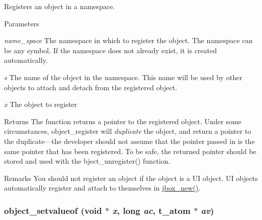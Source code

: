 Registers an object in a namespace. 
\begin{DoxyParams}{Parameters}
\item[{\em name\_\-space}]The namespace in which to register the object. The namespace can be any symbol. If the namespace does not already exist, it is created automatically. \item[{\em s}]The name of the object in the namespace. This name will be used by other objects to attach and detach from the registered object. \item[{\em x}]The object to register\end{DoxyParams}
\begin{DoxyReturn}{Returns}
The function returns a pointer to the registered object. Under some circumstances, object\_\-register will {\itshape duplicate\/} the object, and return a pointer to the duplicate—the developer should not assume that the pointer passed in is the same pointer that has been registered. To be safe, the returned pointer should be stored and used with the bject\_\-unregister() function.
\end{DoxyReturn}
\begin{DoxyRemark}{Remarks}
You should not register an object if the object is a UI object. UI objects automatically register and attach to themselves in \hyperlink{group__jbox_gaaa460d02ca3d22c54368ade59d8e330b}{jbox\_\-new()}. 
\end{DoxyRemark}
\hypertarget{group__obj_ga9d653fc9249f24c462f14657b969cc4d}{
\subsubsection[{object\_\-setvalueof}]{ object\_\-setvalueof (void $\ast$ {\em x}, \/  long {\em ac}, \/  {\bf t\_\-atom} $\ast$ {\em av})}}
\label{group__obj_ga9d653fc9249f24c462f14657b969cc4d}


